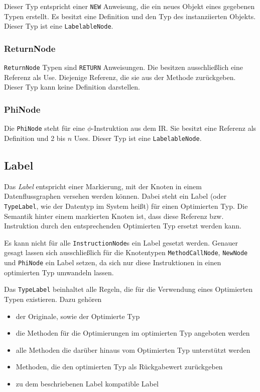 Dieser Typ entspricht einer \texttt{NEW} Anweisung, die ein neues Objekt eines 
gegebenen Typen erstellt. Es besitzt eine Definition und den Typ des instanziierten
Objekts. Dieser Typ ist eine \texttt{LabelableNode}.

\subsubsection{ReturnNode}

\texttt{ReturnNode} Typen sind \texttt{RETURN} Anweisungen. Die besitzen 
ausschließlich eine Referenz als Use. Diejenige Referenz, die sie aus der Methode 
zurückgeben. Dieser Typ kann keine Definition darstellen.

\subsubsection{PhiNode}

Die \texttt{PhiNode} steht für eine $\phi$-Instruktion aus dem IR. Sie besitzt eine
Referenz als Definition und 2 bis $n$ Uses. Dieser Typ ist eine \texttt{LabelableNode}.

\subsection{Label}

Das \textit{Label} entspricht einer Markierung, mit der Knoten in einem 
Datenflussgraphen versehen werden können. Dabei steht ein Label (oder 
\texttt{TypeLabel}, wie der Datentyp im System heißt) für einen Optimierten Typ.
Die Semantik hinter einem markierten Knoten ist, dass diese Referenz bzw. Instruktion
durch den entsprechenden Optimierten Typ ersetzt werden kann.

Es kann nicht für alle \texttt{InstructionNode}s ein Label gesetzt werden. Genauer
gesagt lassen sich ausschließlich für die Knotentypen \texttt{MethodCallNode}, 
\texttt{NewNode} und \texttt{PhiNode} ein Label setzen, da sich nur diese 
Instruktionen in einen optimierten Typ umwandeln lassen.

Das \texttt{TypeLabel} beinhaltet alle Regeln, die für die Verwendung eines
Optimierten Typen existieren. Dazu gehören

\begin{itemize}
	\item der Originale, sowie der Optimierte Typ
	\item die Methoden für die Optimierungen im optimierten Typ angeboten werden
	\item alle Methoden die darüber hinaus vom Optimierten Typ unterstützt werden
	\item Methoden, die den optimierten Typ als Rückgabewert zurückgeben
	\item zu dem beschriebenen Label kompatible Label
\end{itemize}

